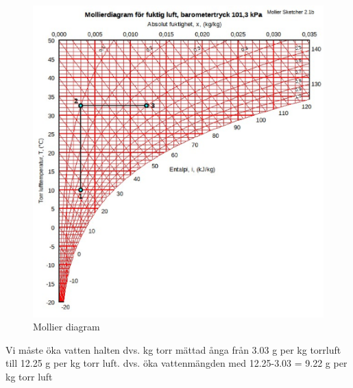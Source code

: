 \documentclass[./exercises.tex]{subfiles}
\begin{document}
\begin{enumerate}
\begin{figure}[H]
  \includegraphics[width=\linewidth]{E20210602.eps}
  \caption{Mollier diagram}
  \label{fig4}
\end{figure}

Vi måste öka vatten halten dvs. kg torr mättad ånga från
3.03 g per kg torrluft till 12.25 g per kg torr luft.
dvs. öka vattenmängden med 12.25-3.03 =  9.22 g per kg torr luft

\end{enumerate}




\end{document}

